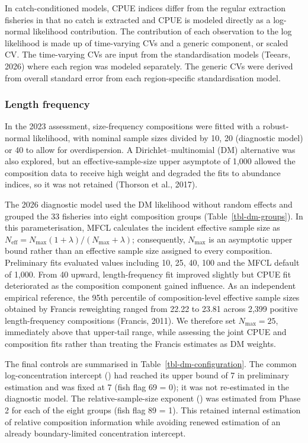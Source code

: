 \documentclass[
  english,
  a4paper,
  a4paper,
  11pt]{SCreport}
\begin{document}
In catch-conditioned models, CPUE indices differ from the regular
extraction fisheries in that no catch is extracted and CPUE is modeled
directly as a log-normal likelihood contribution. The contribution of
each observation to the log likelihood is made up of time-varying CVs
and a generic component, or scaled CV. The time-varying CVs are input
from the standardisation models (Teears, 2026) where each region was
modeled separately. The generic CVs were derived from overall standard
error from each region-specific standardisation model.

\subsubsection{Length frequency}\label{sec-sizefreq-likelihood}

In the 2023 assessment, size-frequency compositions were fitted with a
robust-normal likelihood, with nominal sample sizes divided by 10, 20
(diagnostic model) or 40 to allow for overdispersion. A
Dirichlet--multinomial (DM) alternative was also explored, but an
effective-sample-size upper asymptote of 1,000 allowed the composition
data to receive high weight and degraded the fits to abundance indices,
so it was not retained (Thorson et al., 2017).

The 2026 diagnostic model used the DM likelihood without random effects
and grouped the 33 fisheries into eight composition groups
(Table~\ref{tbl-dm-groups}). In this parameterisation, MFCL calculates
the incident effective sample size as
\(N_{\mathrm{eff}}=N_{\max}(1+\lambda)/(N_{\max}+\lambda)\);
consequently, \(N_{\max}\) is an asymptotic upper bound rather than an
effective sample size assigned to every composition. Preliminary fits
evaluated values including 10, 25, 40, 100 and the MFCL default of
1,000. From 40 upward, length-frequency fit improved slightly but CPUE
fit deteriorated as the composition component gained influence. As an
independent empirical reference, the 95th percentile of
composition-level effective sample sizes obtained by Francis reweighting
ranged from 22.22 to 23.81 across 2,399 positive length-frequency
compositions (Francis, 2011). We therefore set \(N_{\max}=25\),
immediately above that upper-tail range, while assessing the joint CPUE
and composition fits rather than treating the Francis estimates as DM
weights.

The final controls are summarised in Table~\ref{tbl-dm-configuration}.
The common log-concentration intercept () had
reached its upper bound of 7 in preliminary estimation and was fixed at
7 (fish flag 69 = 0); it was not re-estimated in the diagnostic model.
The relative-sample-size exponent () was
estimated from Phase 2 for each of the eight groups (fish flag 89 = 1).
This retained internal estimation of relative composition information
while avoiding renewed estimation of an already boundary-limited
concentration intercept.
\end{document}
